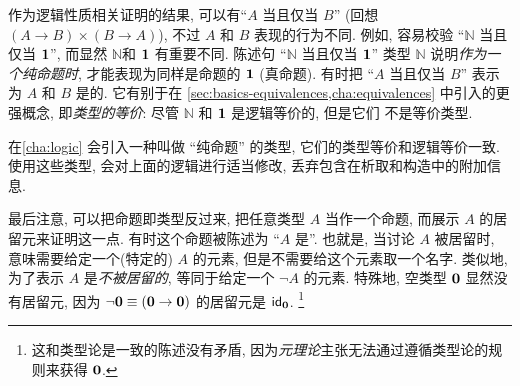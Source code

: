 作为逻辑性质相关证明的结果, 可以有``$A$ 当且仅当 $B$'' (回想 $(A\to B)\times (B\to A)$), 不过 $A$ 和 $B$ 表现的行为不同.
例如, 容易校验 ``$\mathbb{N}$ 当且仅当 $\unit$'', 而显然 $\mathbb{N}$和 $\unit$ 有重要不同.
陈述句 ``$\mathbb{N}$ 当且仅当 $\unit$'' 类型 $\mathbb{N}$ 说明\emph{作为一个纯命题时}, 才能表现为同样是命题的 $\unit$ (真命题).
有时把 ``$A$ 当且仅当 $B$'' 表示为 $A$ 和 $B$ 是的.
%
%
它有别于在  \cref{sec:basics-equivalences,cha:equivalences} 中引入的更强概念, 即\emph{类型的等价}: 尽管 $\mathbb{N}$ 和 $\unit$ 是逻辑等价的, 但是它们 不是等价类型.

在\cref{cha:logic} 会引入一种叫做 ``纯命题'' 的类型, 它们的类型等价和逻辑等价一致.
使用这些类型, 会对上面的逻辑进行适当修改,  丢弃包含在析取和构造中的附加信息.

最后注意, 可以把命题即类型反过来, 把任意类型 $A$ 当作一个命题, 而展示 $A$ 的居留元来证明这一点.
有时这个命题被陈述为 ``$A$ 是''.
%
%
也就是, 当讨论 $A$ 被居留时, 意味需要给定一个(特定的) $A$ 的元素, 但是不需要给这个元素取一个名字.
类似地, 为了表示 $A$ 是\emph{不被居留的}, 等同于给定一个 $\neg A$ 的元素.
特殊地, 空类型 $\emptyt$ 显然没有居留元, 因为 $\neg \emptyt \jdeq (\emptyt \to \emptyt)$ 的居留元是 $\idfunc[\emptyt]$.
\footnote{这和类型论是一致的陈述没有矛盾, 因为\emph{元理论}主张无法通过遵循类型论的规则来获得 $\emptyt$.}

%
%
%